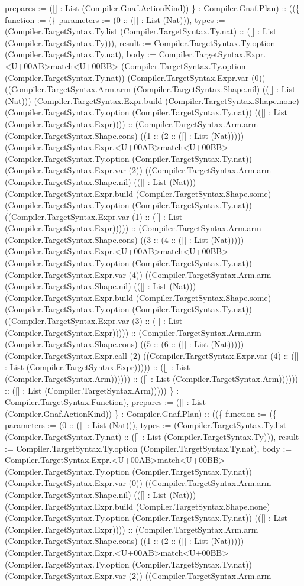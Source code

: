\documentclass[11pt]{article}
\begin{document}
prepares := ([] : List (Compiler.Gnaf.ActionKind)) \} : Compiler.Gnaf.Plan) :: ((\{ function := (\{ parameters := (0 :: ([] : List (Nat))), types := (Compiler.TargetSyntax.Ty.list (Compiler.TargetSyntax.Ty.nat) :: ([] : List (Compiler.TargetSyntax.Ty))), result := Compiler.TargetSyntax.Ty.option (Compiler.TargetSyntax.Ty.nat), body := Compiler.TargetSyntax.Expr.<U+00AB>match<U+00BB> (Compiler.TargetSyntax.Ty.option (Compiler.TargetSyntax.Ty.nat)) (Compiler.TargetSyntax.Expr.var (0)) ((Compiler.TargetSyntax.Arm.arm (Compiler.TargetSyntax.Shape.nil) (([] : List (Nat))) (Compiler.TargetSyntax.Expr.build (Compiler.TargetSyntax.Shape.none) (Compiler.TargetSyntax.Ty.option (Compiler.TargetSyntax.Ty.nat)) (([] : List (Compiler.TargetSyntax.Expr)))) :: (Compiler.TargetSyntax.Arm.arm (Compiler.TargetSyntax.Shape.cons) ((1 :: (2 :: ([] : List (Nat))))) (Compiler.TargetSyntax.Expr.<U+00AB>match<U+00BB> (Compiler.TargetSyntax.Ty.option (Compiler.TargetSyntax.Ty.nat)) (Compiler.TargetSyntax.Expr.var (2)) ((Compiler.TargetSyntax.Arm.arm (Compiler.TargetSyntax.Shape.nil) (([] : List (Nat))) (Compiler.TargetSyntax.Expr.build (Compiler.TargetSyntax.Shape.some) (Compiler.TargetSyntax.Ty.option (Compiler.TargetSyntax.Ty.nat)) ((Compiler.TargetSyntax.Expr.var (1) :: ([] : List (Compiler.TargetSyntax.Expr))))) :: (Compiler.TargetSyntax.Arm.arm (Compiler.TargetSyntax.Shape.cons) ((3 :: (4 :: ([] : List (Nat))))) (Compiler.TargetSyntax.Expr.<U+00AB>match<U+00BB> (Compiler.TargetSyntax.Ty.option (Compiler.TargetSyntax.Ty.nat)) (Compiler.TargetSyntax.Expr.var (4)) ((Compiler.TargetSyntax.Arm.arm (Compiler.TargetSyntax.Shape.nil) (([] : List (Nat))) (Compiler.TargetSyntax.Expr.build (Compiler.TargetSyntax.Shape.some) (Compiler.TargetSyntax.Ty.option (Compiler.TargetSyntax.Ty.nat)) ((Compiler.TargetSyntax.Expr.var (3) :: ([] : List (Compiler.TargetSyntax.Expr))))) :: (Compiler.TargetSyntax.Arm.arm (Compiler.TargetSyntax.Shape.cons) ((5 :: (6 :: ([] : List (Nat))))) (Compiler.TargetSyntax.Expr.call (2) ((Compiler.TargetSyntax.Expr.var (4) :: ([] : List (Compiler.TargetSyntax.Expr))))) :: ([] : List (Compiler.TargetSyntax.Arm)))))) :: ([] : List (Compiler.TargetSyntax.Arm)))))) :: ([] : List (Compiler.TargetSyntax.Arm))))) \} : Compiler.TargetSyntax.Function), prepares := ([] : List (Compiler.Gnaf.ActionKind)) \} : Compiler.Gnaf.Plan) :: ((\{ function := (\{ parameters := (0 :: ([] : List (Nat))), types := (Compiler.TargetSyntax.Ty.list (Compiler.TargetSyntax.Ty.nat) :: ([] : List (Compiler.TargetSyntax.Ty))), result := Compiler.TargetSyntax.Ty.option (Compiler.TargetSyntax.Ty.nat), body := Compiler.TargetSyntax.Expr.<U+00AB>match<U+00BB> (Compiler.TargetSyntax.Ty.option (Compiler.TargetSyntax.Ty.nat)) (Compiler.TargetSyntax.Expr.var (0)) ((Compiler.TargetSyntax.Arm.arm (Compiler.TargetSyntax.Shape.nil) (([] : List (Nat))) (Compiler.TargetSyntax.Expr.build (Compiler.TargetSyntax.Shape.none) (Compiler.TargetSyntax.Ty.option (Compiler.TargetSyntax.Ty.nat)) (([] : List (Compiler.TargetSyntax.Expr)))) :: (Compiler.TargetSyntax.Arm.arm (Compiler.TargetSyntax.Shape.cons) ((1 :: (2 :: ([] : List (Nat))))) (Compiler.TargetSyntax.Expr.<U+00AB>match<U+00BB> (Compiler.TargetSyntax.Ty.option (Compiler.TargetSyntax.Ty.nat)) (Compiler.TargetSyntax.Expr.var (2)) ((Compiler.TargetSyntax.Arm.arm 
\end{document}
